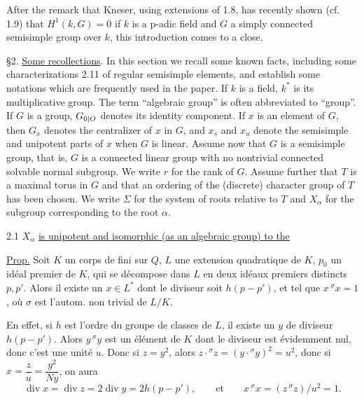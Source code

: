 After the remark that Kneser, using extensions of 1.8, has recently shown (cf. 1.9) that $H^1(k,G)=0$ if $k$ is a p-adic field and $G$ a simply connected semisimple group over $k$, this introduction comes to a close.

\S2. \uline{Some recollections}. In this section we recall some known facts, including some characterizations 2.11 of regular semisimple elements, and establish some notations which are frequently used in the paper. If $k$ is a field, $k^*$ is its multiplicative group. The term ``algebraic group'' is often abbreviated to ``group''. If $G$ is a group, $G_{{0|O}}$ denotes its identity component. If $x$ is an element of $G$, then $G_x$ denotes the centralizer of $x$ in $G$, and $x_s$ and $x_u$ denote the semisimple and unipotent parts of $x$ when $G$ is linear. Assume now that $G$ is a semisimple group, that is, $G$ is a connected linear group with no nontrivial connected solvable normal subgroup. We write $r$ for the rank of $G$. Assume further that $T$ is a maximal torus in $G$ and that an ordering of the (discrete) character group of $T$ has been chosen. We write $\Sigma$ for the system of roots relative to $T$ and $X_\alpha$ for the subgroup corresponding to the root $\alpha$.

2.1 $X_\alpha$ \uline{is unipotent and isomorphic (as an algebraic group) to the}


\uline{Prop.} Soit $K$ un corps de  fini sur $Q$, $L$ une extension quadratique de $K$, $p_0$ un idéal premier de $K$,  qui se décompose dans $L$ en deux idéaux premiers distincts $p,p'$. Alors il existe un $x\in L^*$   dont le diviseur soit $h(p-p')$,  et tel que $x\,{}^\sigma x=1$, où $\sigma$ est l'autom. non trivial de $L/K$.


En effet,  si $h$ est l'ordre du groupe de classes  de $L$, il existe un $y$ de diviseur $h(p-p')$. Alors $y\,{}^\sigma y$ est un élément de $K$ dont le diviseur est évidemment nul, donc c'est une unité $u$.
Donc si $z=y^2$, alors  $z\cdot{}^\sigma z=(y\cdot{}^\sigma y)^2=u^2$, donc si $x=\dfrac{z}{u}=\dfrac{y^2}{Ny}$, on aura
\[
\operatorname{div}x=\operatorname{div}z=2\operatorname{div}y=2h(p-p'),\qquad\text{et}\qquad x\,{}^\sigma x=(z\,{}^\sigma z)/u^2=1.
\]

